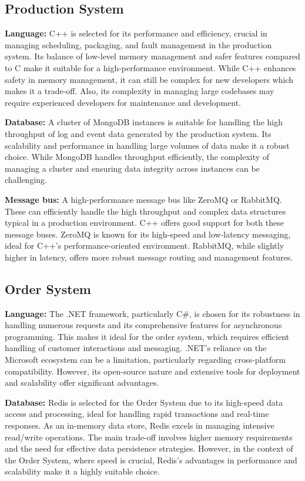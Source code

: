 \documentclass[conference]{IEEEtran}
\begin{document}
\subsection*{Production System}

\textbf{Language:} C++ is selected for its performance and efficiency, crucial in managing scheduling, packaging, and fault management in the production system. Its balance of low-level memory management and safer features compared to C make it suitable for a high-performance environment. While C++ enhances safety in memory management, it can still be complex for new developers which makes it a trade-off. Also, its complexity in managing large codebases may require experienced developers for maintenance and development.

\textbf{Database:} A cluster of MongoDB instances is suitable for handling the high throughput of log and event data generated by the production system. Its scalability and performance in handling large volumes of data make it a robust choice. While MongoDB handles throughput efficiently, the complexity of managing a cluster and ensuring data integrity across instances can be challenging.

\textbf{Message bus:} A high-performance message bus like ZeroMQ or RabbitMQ. These can efficiently handle the high throughput and complex data structures typical in a production environment. C++ offers good support for both these message buses. ZeroMQ is known for its high-speed and low-latency messaging, ideal for C++'s performance-oriented environment. RabbitMQ, while slightly higher in latency, offers more robust message routing and management features.

\subsection*{Order System}

\textbf{Language:} The .NET framework, particularly C\#, is chosen for its robustness in handling numerous requests and its comprehensive features for asynchronous programming. This makes it ideal for the order system, which requires efficient handling of customer interactions and messaging. .NET's reliance on the Microsoft ecosystem can be a limitation, particularly regarding cross-platform compatibility. However, its open-source nature and extensive tools for deployment and scalability offer significant advantages.

\textbf{Database:} Redis is selected for the Order System due to its high-speed data access and processing, ideal for handling rapid transactions and real-time responses. As an in-memory data store, Redis excels in managing intensive read/write operations. The main trade-off involves higher memory requirements and the need for effective data persistence strategies. However, in the context of the Order System, where speed is crucial, Redis's advantages in performance and scalability make it a highly suitable choice.
\end{document}

